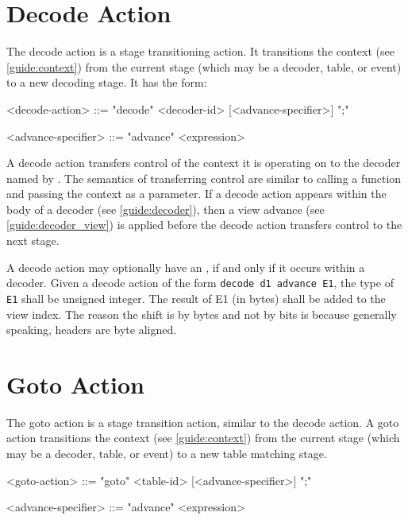 \section{Decode Action} \label{guide:decode_action}

The decode action is a stage transitioning action. It transitions the context (see \ref{guide:context}) from the current stage (which may be a decoder, table, or event) to a new decoding stage. It has the form:

\begin{minip}
\begin{grammar}
<decode-action> ::=
"decode" <decoder-id> [<advance-specifier>] ";"

<advance-specifier> ::= "advance" <expression>
\end{grammar}
\end{minip}

A decode action transfers control of the context it is operating on to the decoder named by . The semantics of transferring control are similar to calling a function and passing the context as a parameter. If a decode action appears within the body of a decoder (see \ref{guide:decoder}), then a view advance (see \ref{guide:decoder_view}) is applied before the decode action transfers control to the next stage.

A decode action may optionally have an , if and only if it occurs within a decoder. Given a decode action of the form \texttt{decode d1 advance E1}, the type of \texttt{E1} shall be unsigned integer. The result of E1 (in bytes) shall be added to the view index. The reason the shift is by bytes and not by bits is because generally speaking, headers are byte aligned.

\section{Goto Action} \label{guide:goto}

The goto action is a stage transition action, similar to the decode action. A goto action transitions the context (see \ref{guide:context}) from the current stage (which may be a decoder, table, or event) to a new table matching stage.

\begin{minip}
\begin{grammar}
<goto-action> ::=
"goto" <table-id> [<advance-specifier>] ";"

<advance-specifier> ::= "advance" <expression>
\end{grammar}
\end{minip}

